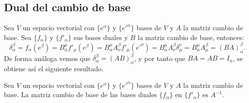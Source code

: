 \subsection{Dual del cambio de base}\label{subsec:dual-del-cambio-de-base}
Sea $V$ un espacio vectorial con $\{e^\alpha\}$ y $\{e'^\alpha\}$ bases de $V$ y $A$ la matriz cambio de base.
Sea $\{f_\alpha\}$ y $\{f'_\alpha\}$ sus bases duales y $B$ la matriz cambio de base, entonces:
\[
  \delta_\alpha^\beta=f_\alpha(e^\beta)=B_\alpha^\mu f'_\mu(e^\beta)=B_\alpha^\mu A^\beta_\nu f'_\mu(e'^\nu)=B_\alpha^\mu A^\beta_\nu\delta^\nu_\mu=B_\alpha^\mu A^\beta_\mu=(BA)^\beta_\alpha.
\]
De forma análoga vemos que $\delta^\beta_\alpha=(AB)^\beta_\alpha$, y por tanto que $BA=AB=I_n$, se obtiene así el
siguiente resultado.

\begin{proposition}
  \label{res:dual_cambio_base}
  Sea $V$ un espacio vectorial con $\{e^\alpha\}$ y $\{e'^\alpha\}$ bases de $V$ y $A$ la matriz cambio de base.
  La matriz cambio de base de las bases duales $\{f_\alpha\}$ en $\{f'_\alpha\}$ es $A^{-1}$.

\end{proposition}
